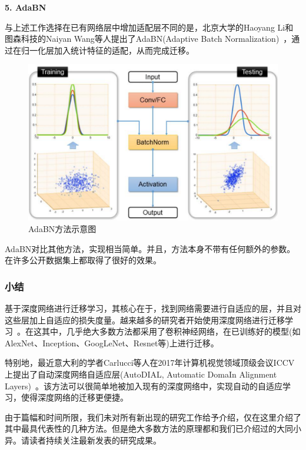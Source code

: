 \textbf{5. AdaBN}

与上述工作选择在已有网络层中增加适配层不同的是，北京大学的Haoyang Li和图森科技的Naiyan Wang等人提出了AdaBN(Adaptive Batch Normalization)~\cite{li2018adaptive}，通过在归一化层加入统计特征的适配，从而完成迁移。

\begin{figure}[htbp]
	\centering
	\includegraphics[scale=0.38]{./figures/fig-deep-adabn.pdf}
	\caption{AdaBN方法示意图}
	\label{fig-deep-adabn}
\end{figure}

AdaBN对比其他方法，实现相当简单。并且，方法本身不带有任何额外的参数。在许多公开数据集上都取得了很好的效果。

\subsubsection{小结}

基于深度网络进行迁移学习，其核心在于，找到网络需要进行自适应的层，并且对这些层加上自适应的损失度量。越来越多的研究者开始使用深度网络进行迁移学习~\cite{long2016deep,zhuo2017deep,zhuang2015supervised,sun2016deep,wei2016deep,luo2017label}。在这其中，几乎绝大多数方法都采用了卷积神经网络，在已训练好的模型(如AlexNet、Inception、GoogLeNet、Resnet等)上进行迁移。

特别地，最近意大利的学者Carlucci等人在2017年计算机视觉领域顶级会议ICCV上提出了自动深度网络自适应层(AutoDIAL, Automatic DomaIn Alignment Layers)~\cite{carlucci2017autodial}。该方法可以很简单地被加入现有的深度网络中，实现自动的自适应学习，使得深度网络的迁移更便捷。

由于篇幅和时间所限，我们未对所有新出现的研究工作给予介绍，仅在这里介绍了其中最具代表性的几种方法。但是绝大多数方法的原理都和我们已介绍过的大同小异。请读者持续关注最新发表的研究成果。

